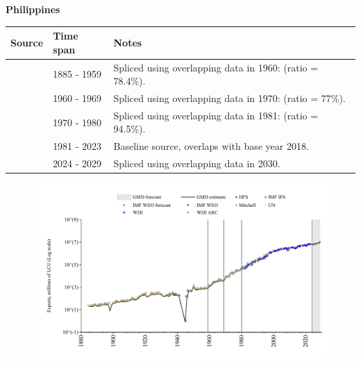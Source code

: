 \documentclass[12pt,a4paper,landscape]{article}
\begin{document}
\begin{adjustbox}{max totalsize={\paperwidth}{\paperheight},center}
\begin{minipage}[t][\textheight][t]{\textwidth}
\vspace*{0.5cm}
{}
\begin{center}
{\Large\bfseries Philippines}
\end{center}
\vspace{0.5cm}
\begin{table}[H]
\centering
\small
\begin{tabular}{|l|l|l|}
\hline
\textbf{Source} & \textbf{Time span} & \textbf{Notes} \\
\hline
\rowcolor{white}\cite{Mitchell}& 1885 - 1959 &Spliced using overlapping data in 1960: (ratio = 78.4\%).\\
\rowcolor{lightgray}\cite{WDI_ARC}& 1960 - 1969 &Spliced using overlapping data in 1970: (ratio = 77\%).\\
\rowcolor{white}\cite{UN}& 1970 - 1980 &Spliced using overlapping data in 1981: (ratio = 94.5\%).\\
\rowcolor{lightgray}\cite{WDI}& 1981 - 2023 &Baseline source, overlaps with base year 2018.\\
\rowcolor{white}\cite{IMF_WEO_forecast}& 2024 - 2029 &Spliced using overlapping data in 2030.\\
\hline
\end{tabular}
\end{table}
\begin{figure}[H]
\centering
\includegraphics[width=\textwidth,height=0.6\textheight,keepaspectratio]{graphs/PHL_exports.pdf}
\end{figure}
\end{minipage}
\end{adjustbox}
\end{document}
